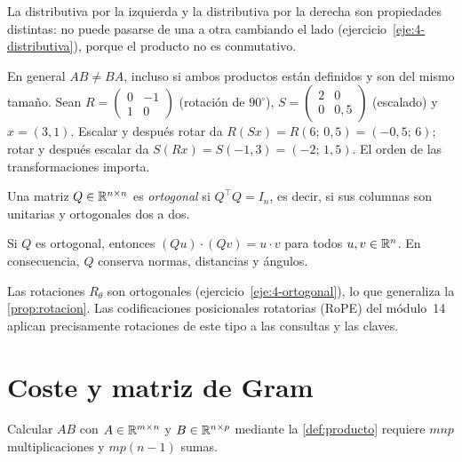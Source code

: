 La distributiva por la izquierda y la distributiva por la derecha son propiedades distintas: no puede pasarse de una a otra cambiando el lado (ejercicio~\ref{eje:4-distributiva}), porque el producto no es conmutativo.

\begin{observacion}[No conmutatividad]\label{obs:no-conmuta}
En general $AB\neq BA$, incluso si ambos productos están definidos y son del mismo tamaño. Sean $R=\begin{pmatrix}0&-1\\1&0\end{pmatrix}$ (rotación de $90^\circ$), $S=\begin{pmatrix}2&0\\0&0{,}5\end{pmatrix}$ (escalado) y $x=(3,1)$. Escalar y después rotar da $R(Sx)=R(6;\,0{,}5)=(-0{,}5;\,6)$; rotar y después escalar da $S(Rx)=S(-1,3)=(-2;\,1{,}5)$. El orden de las transformaciones importa.
\end{observacion}

\begin{definicion}\label{def:ortogonal}
Una matriz $Q\in\mathbb{R}^{n\times n}$ es \emph{ortogonal} si $Q^{\top}Q=I_n$, es decir, si sus columnas son unitarias y ortogonales dos a dos.
\end{definicion}

\begin{proposicion}\label{prop:ortogonal}
Si $Q$ es ortogonal, entonces $(Qu)\cdot(Qv)=u\cdot v$ para todos $u,v\in\mathbb{R}^{n}$. En consecuencia, $Q$ conserva normas, distancias y ángulos.
\end{proposicion}

Las rotaciones $R_\theta$ son ortogonales (ejercicio~\ref{eje:4-ortogonal}), lo que generaliza la \cref{prop:rotacion}. Las codificaciones posicionales rotatorias (RoPE) del módulo~14 aplican precisamente rotaciones de este tipo a las consultas y las claves.

\section{Coste y matriz de Gram}

\begin{proposicion}\label{prop:coste}
Calcular $AB$ con $A\in\mathbb{R}^{m\times n}$ y $B\in\mathbb{R}^{n\times p}$ mediante la \cref{def:producto} requiere $mnp$ multiplicaciones y $mp(n-1)$ sumas.
\end{proposicion}

